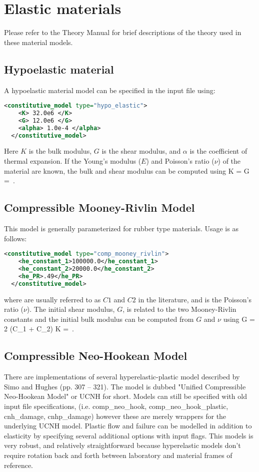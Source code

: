 \section{Elastic materials}
Please refer to the \Vaango Theory Manual for brief descriptions of the theory used in 
these material models.

\subsection{Hypoelastic material}
A hypoelastic material model can be specified in the  input file using:
\begin{lstlisting}[language=XML]
  <constitutive_model type="hypo_elastic">
    <K> 32.0e6 </K>
    <G> 12.0e6 </G>
    <alpha> 1.0e-4 </alpha>
  </constitutive_model>
\end{lstlisting}

Here $K$ is the bulk modulus, $G$ is the shear modulus, and $\alpha$ is the coefficient
of thermal expansion.  If the Young's modulus ($E$) and Poisson's ratio ($\nu$) of the 
material are known, the bulk and shear modulus can be computed using
\Beq
  K =  \quad \Tand \quad
  G =  \,.
\Eeq

\subsection{Compressible Mooney-Rivlin Model} This model is generally parameterized
for rubber type materials.  Usage is as follows:
\begin{lstlisting}[language=XML]
  <constitutive_model type="comp_mooney_rivlin">
    <he_constant_1>100000.0</he_constant_1>
    <he_constant_2>20000.0</he_constant_2>
    <he_PR>.49</he_PR>
  </constitutive_model>
\end{lstlisting}
where  are usually referred to
as $C1$ and $C2$ in the literature, and  is the Poisson's ratio ($\nu$).
The initial shear modulus, $G$, is related to the two Mooney-Rivlin constants and the 
initial bulk modulus can be computed from $G$ and $\nu$ using
\Beq
  G = 2 (C_1 + C_2) \quad \Tand \quad K =  \,.
\Eeq

\subsection{Compressible Neo-Hookean Model} There are implementations of several
hyperelastic-plastic model described by Simo and Hughes\cite{Simo1998} (pp. 307 -- 321). 
 The model is dubbed "Unified Compressible Neo-Hookean Model" or UCNH for short.  Models can 
still be specified with old input file specifications, (i.e. comp\_neo\_hook, comp\_neo\_hook\_plastic,
cnh\_damage, cnhp\_damage) however these are merely wrappers for the underlying UCNH model.
 Plastic flow and failure can be modelled in addition to elasticity by  specifying 
several additional options with input flags. This models is very robust, and relatively 
straightforward because hyperelastic models don't require rotation back and forth 
between laboratory and material frames of reference.

